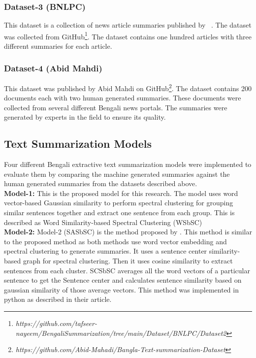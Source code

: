 \subsubsection{Dataset-3 (BNLPC)\cite{Hque-2015-BNLPC-Dataset}}
This dataset is a collection of news article summaries published by \citeauthor{Hque-2015-BNLPC-Dataset}~\cite{Hque-2015-BNLPC-Dataset}.
The dataset was collected from
GitHub\footnote{\textit{https://github.com/tafseer-nayeem/BengaliSummarization/tree/main/Dataset/BNLPC/Dataset2}}.
The dataset contains one hundred articles with three different summaries for each article.

\subsubsection{Dataset-4 (Abid Mahdi)}
This dataset was published by Abid Mahdi on
GitHub\footnote{\textit{https://github.com/Abid-Mahadi/Bangla-Text-summarization-Dataset}}.
The dataset contains 200 documents each with two human generated summaries.
These documents were collected from several different Bengali news portals.
The summaries were generated by experts in the field to ensure its quality.

\subsection{Text Summarization Models}\label{subsec:text-summarization-models}
Four different Bengali extractive text summarization models were implemented to evaluate them by
comparing the machine generated summaries against the human generated summaries from the datasets described above.\\

\textbf{Model-1:} This is the proposed model for this research.
The model uses word vector-based Gaussian similarity to perform spectral clustering for grouping similar
sentences together and extract one sentence from each group.
This is described as Word Similarity-based Spectral Clustering (WSbSC)\\

\textbf{Model-2:} Model-2 (SASbSC) is the method proposed by \citeauthor{roychowdhury-etal-2022-spectral-base}
\cite{roychowdhury-etal-2022-spectral-base}.
This method is similar to the proposed method as both methods use word vector
embedding and spectral clustering to generate summaries.
It uses a sentence center similarity-based graph for spectral clustering.
Then it uses cosine similarity to extract sentences from each cluster.
SCSbSC averages all the word vectors of a particular sentence to get the Sentence center
and calculates sentence similarity based on gaussian similarity of those average vectors.
This method was implemented in python as described in their article.\\

